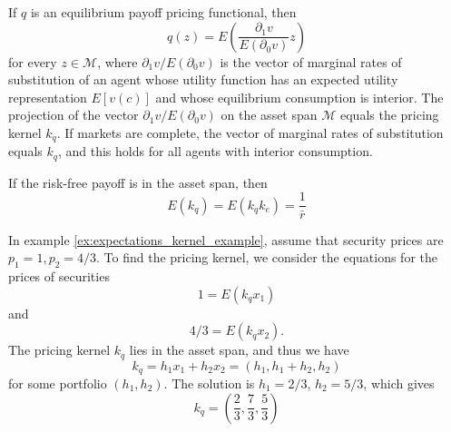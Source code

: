 \documentclass[\topdir/lecture\_notes.tex]{subfiles}
\begin{document}
If \(q\) is an equilibrium payoff pricing functional, then
\begin{equation}
q(z)=E\left(\frac{\partial_{1} v}{E\left(\partial_{0} v\right)} z\right) \label{eq:marginal_rate_substitution}
\end{equation}
for every \(z \in \mathcal{M}\), where \(\partial_{1} v / E\left(\partial_{0} v\right)\) is the vector of marginal rates of substitution of an agent whose utility function has an expected utility representation \(E[v(c)]\) and whose equilibrium consumption is interior. The projection of the vector \(\partial_{1} v / E(\partial_{0} v)\) on the asset span \(\mathcal{M}\) equals the pricing kernel \(k_{q}\). If markets are complete, the vector of marginal rates of substitution equals \(k_{q}\), and this holds for all agents with interior consumption.

If the risk-free payoff is in the asset span, then
\begin{equation*}
E(k_{q})=E(k_{q} k_{e})=\frac{1}{\bar{r}} 
\end{equation*}

\begin{example}\label{ex:pricing_kernel_example}
In example \ref{ex:expectations_kernel_example}, assume that security prices are \(p_{1}=1, p_{2}=4/3\). To find the pricing kernel, we consider the equations for the prices of securities
\begin{equation*}
1=E(k_{q} x_{1}) 
\end{equation*}
and
\begin{equation*}
4 / 3=E(k_{q} x_{2}). 
\end{equation*}
The pricing kernel \(k_{q}\) lies in the asset span, and thus we have
\begin{equation*}
k_{q}=h_{1} x_{1}+h_{2} x_{2}=(h_{1}, h_{1}+h_{2}, h_{2}) 
\end{equation*}
for some portfolio $(h_{1}, h_{2})$. The solution is \(h_{1}=2/3\), \(h_{2}=5/3\), which gives
\begin{equation*}
k_{q}=(\frac{2}{3}, \frac{7}{3}, \frac{5}{3}) 
\end{equation*}
\end{example}
\end{document}
